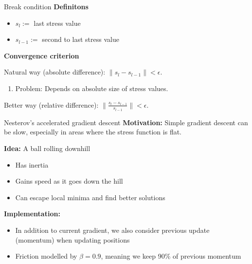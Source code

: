 \documentclass{beamer}
\begin{document}
\begin{frame}{Break condition}
    \textbf{Definitons}
    \begin{itemize}
        \item $s_l :=$ last stress value
        \item $s_{l-1} :=$ second to last stress value
    \end{itemize}

    \textbf{Convergence criterion}

    Natural way (absolute difference): $\parallel s_l - s_{l-1} \parallel < \epsilon$.

    \begin{enumerate}[$\rightarrow$]
        \item Problem: Depends on absolute size of stress values.
    \end{enumerate}

    Better way (relative difference): $\parallel \frac{s_l - s_{l-1}}{s_{l-1}} \parallel < \epsilon$.
\end{frame}

\begin{frame}{Nesterov's accelerated gradient descent}
    \textbf{Motivation:} Simple gradient descent can be slow, especially in areas where the stress function is flat.

    \textbf{Idea:} A ball rolling downhill
    \begin{itemize}
        \item Has inertia
        \item Gains speed as it goes down the hill
        \item Can escape local minima and find better solutions
    \end{itemize}

    \textbf{Implementation:} 
    \begin{itemize}
        \item In addition to current gradient, we also consider previous update (momentum) when updating positions
        \item Friction modelled by $\beta = 0.9$, meaning we keep 90\% of previous momentum
    \end{itemize}
\end{frame}
\end{document}
